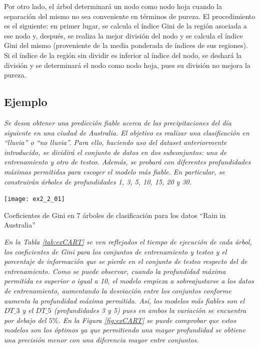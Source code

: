\documentclass[12pt,twoside]{article}
\begin{document}
Por otro lado, el árbol determinará un nodo como nodo hoja cuando la separación del mismo no sea conveniente en términos de pureza. El procedimiento es el siguiente: en primer lugar, se calcula el índice Gini de la región asociada a ese nodo y, después, se realiza la mejor división del nodo y se calcula el índice Gini del mismo (proveniente de la media ponderada de índices de sus regiones). Si el índice de la región sin dividir es inferior al índice del nodo, se deshará la división y se determinará el nodo como nodo hoja, pues su división no mejora la pureza.





\subsection{Ejemplo} \label{ex:CART}
\emph{Se desea obtener una predicción fiable acerca de las precipitaciones del día siguiente en una ciudad de Australia. El objetivo es realizar una clasificación en ``lluvia'' o ``no lluvia''. Para ello, haciendo uso del dataset anteriormente introducido, se dividirá el conjunto de datos en dos subconjuntos: uno de entrenamiento y otro de testeo. Además, se probará con diferentes profundidades máximas permitidas para escoger el modelo más fiable. En particular, se construirán árboles de profundidades 1, 3, 5, 10, 15, 20 y 30.}

\begin{table}[H]
\centering
\texttt{[image: ex2\_2\_01]}
\caption{Coeficientes de Gini en 7 árboles de clasificación para los datos ``Rain in Australia''}
\label{tab:exCART}
\end{table}

\emph{En la Tabla \ref{tab:exCART} se ven reflejados el tiempo de ejecución de cada árbol, los coeficientes de Gini para los conjuntos de entrenamiento y testeo y el porcentaje de información que se pierde en el conjunto de testeo respecto del de entrenamiento. Como se puede observar, cuando la profundidad máxima permitida es superior o igual a 10, el modelo empieza a sobreajustarse a los datos de entrenamiento, aumentando la desviación entre los conjuntos conforme aumenta la profundidad máxima permitida. Así, los modelos más fiables son el $DT\_3$ y el $DT\_5$ (profundidades 3 y 5) pues en ambos la variación se encuentra por debajo del $5\%$. En la Figura \ref{fig:exCART} se puede comprobar que estos modelos son los óptimos ya que permitiendo una mayor profundidad se obtiene una precisión menor con una diferencia mayor entre conjuntos.}
\end{document}
